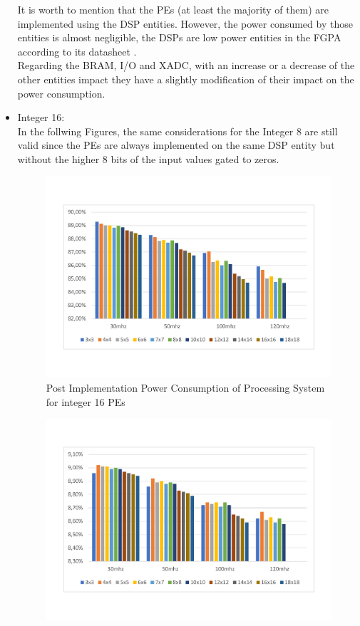 \begin{itemize}
It is worth to mention that the PEs (at least the majority of them) are implemented using the DSP entities. However, the power consumed by those entities is almost negligible,  the DSPs are low power entities in the FGPA according to its datasheet \cite{paper:42}.\\
Regarding the BRAM, I/O and XADC, with an increase or a decrease of the other entities impact they have a slightly modification of their impact on the power consumption.\\
\item Integer 16:\\
In the follwing Figures, the same considerations for the Integer 8 are still valid since the PEs are always implemented on the same DSP entity but without the higher 8 bits of the input values gated to zeros.
\begin{figure}[!htbp]
\centering
\captionsetup{justification=centering}
\includegraphics[scale=0.5,angle=0]{./figure/graphs/power_ps_int16_freq.pdf}
\caption{Post Implementation Power Consumption of Processing System for integer 16 PEs}
\label{fig:powint16}
\end{figure}
\begin{figure}[!htbp]
\centering
\captionsetup{justification=centering}
\includegraphics[scale=0.5,angle=0]{./figure/graphs/power_plstatic_int16_freq.pdf}

\end{figure}
\end{itemize}
